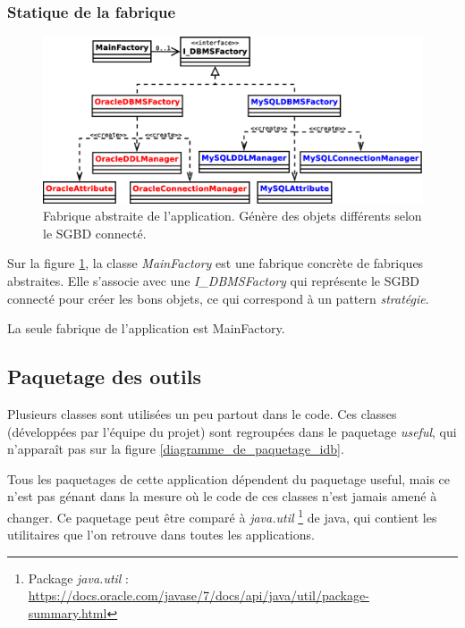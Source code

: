\subsubsection{Statique de la fabrique}
\begin{figure}[!h]
  \centering
  \includegraphics[width=14cm]{images/diagramme_classes_fabriques.eps}
  \caption{Fabrique abstraite de l'application. Génère des objets différents selon le SGBD connecté.}
  \label{diagramme_classes_fabrique}
\end{figure}

Sur la figure \ref{diagramme_classes_fabrique}, la classe \textit{MainFactory} est une fabrique concrète de fabriques abstraites.
Elle s'associe avec une \textit{I\_DBMSFactory} qui représente le SGBD connecté pour créer les bons objets, ce qui correspond à un pattern \textit{stratégie}.

La seule fabrique de l'application est MainFactory.

\subsection{Paquetage des outils}
Plusieurs classes sont utilisées un peu partout dans le code.
Ces classes (développées par l'équipe du projet) sont regroupées dans le paquetage \textit{useful}, qui n'apparaît pas sur la figure \ref{diagramme_de_paquetage_idb}.

Tous les paquetages de cette application dépendent du paquetage useful, mais ce n'est pas génant dans la mesure où le code de ces classes n'est jamais amené à changer.
Ce paquetage peut être comparé à \textit{java.util}
\footnote{\label{paguetage_java_util}Package \textit{java.util} : \url{https://docs.oracle.com/javase/7/docs/api/java/util/package-summary.html}}
de java, qui contient les utilitaires que l'on retrouve dans toutes les applications.
